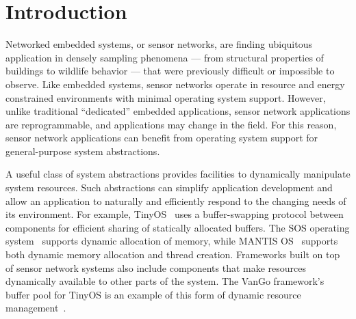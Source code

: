 \section{Introduction}
\label{sec:intro}

Networked embedded systems, or sensor networks, are finding ubiquitous
application in densely sampling phenomena --- from structural
properties of buildings to wildlife behavior --- that were previously
difficult or impossible to observe.  Like embedded systems, sensor
networks operate in resource and energy constrained environments with
minimal operating system support.  However, unlike traditional
``dedicated'' embedded applications, sensor network applications are
reprogrammable, and applications may change in the field.  For this
reason, sensor network applications can benefit from operating system
support for general-purpose system abstractions.

A useful class of system abstractions provides facilities to
dynamically manipulate system resources.  
%
%
Such abstractions can simplify application development and allow an
application to naturally and efficiently respond to the changing needs of its
environment.  
%
%
For example, TinyOS~\cite{TinyOS} uses a buffer-swapping protocol 
between components for
efficient sharing of statically allocated buffers.  
The SOS operating system~\cite{sos} supports dynamic
allocation of memory, while MANTIS OS~\cite{abrach03mantis} supports
both dynamic memory allocation and thread creation.
Frameworks built on
top of sensor network systems also include components that make
resources dynamically available to other parts of the system.  The
VanGo framework's buffer pool for
TinyOS is an example of this form of dynamic resource 
management~\cite{greenstein05vango}.

%
%


